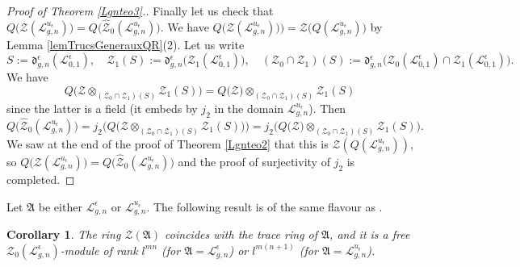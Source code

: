 \documentclass[11pt]{amsart}
\newtheorem{cor}[teo]{Corollary}
\newcommand{\e}{\epsilon}
\newcommand{\Ll}{\mathcal{L}}
\begin{document}
\begin{proof}[Proof of Theorem \ref{Lgnteo3}.]
Finally let us check that $Q\bigl(\mathcal{Z}(\Ll_{g,n}^{u_\e})\bigr) = Q\bigl( \hat{\mathcal{Z}}_0(\Ll_{g,n}^{u_\e}) \bigr)$. We have $Q\bigl(\mathcal{Z}(\Ll_{g,n}^{u_\e})\bigr)) =  \mathcal{Z}\bigl(Q(\Ll_{g,n}^{u_\e})\bigr)$ by Lemma \ref{lemTrucsGenerauxQR}(2). Let us write
\[ S := \mathfrak{d}_{g,n}^{\e}(\mathcal{L}_{0,1}^\e), \quad \mathcal{Z}_1(S) := \mathfrak{d}_{g,n}^{\e}\bigl(\mathcal{Z}_1(\mathcal{L}_{0,1}^\e)\bigr), \quad (\mathcal{Z}_0\cap \mathcal{Z}_1)(S) := \mathfrak{d}_{g,n}^{\e}\bigl(\mathcal{Z}_0(\mathcal{L}_{0,1}^\e) \cap \mathcal{Z}_1(\mathcal{L}_{0,1}^\e)\bigr). \]
We have 
\[ Q\bigl( \mathcal{Z} \otimes_{(\mathcal{Z}_0\cap \mathcal{Z}_1)(S)} \mathcal{Z}_1(S)\bigr) =  Q\bigl( \mathcal{Z} \bigr) \otimes_{(\mathcal{Z}_0\cap \mathcal{Z}_1)(S)} \mathcal{Z}_1(S) \]
since the latter is a field (it embeds by $j_2$ in the domain $\Ll_{g,n}^{u_\e}$). Then
\[ Q\bigl( \hat{\mathcal{Z}}_0(\Ll_{g,n}^{u_\e}) \bigr) = j_2\bigl( Q\bigl( \mathcal{Z} \otimes_{(\mathcal{Z}_0\cap \mathcal{Z}_1)(S)} \mathcal{Z}_1(S)\bigr)\bigr) = j_2\bigl( Q\bigl( \mathcal{Z} \bigr) \otimes_{(\mathcal{Z}_0\cap \mathcal{Z}_1)(S)} \mathcal{Z}_1(S)\bigr). \]
We saw at the end of the proof of Theorem \ref{Lgnteo2} that this is $\mathcal{Z}(Q(\Ll_{g,n}^{u_\e}))$, so $Q\bigl(\mathcal{Z}(\Ll_{g,n}^{u_\e})\bigr) = Q\bigl( \hat{\mathcal{Z}}_0(\Ll_{g,n}^{u_\e}) \bigr)$ and the proof of surjectivity of $j_2$ is completed.
\end{proof}

Let $\mathfrak{A}$ be either $\Ll_{g,n}^{\e}$ or $\Ll_{g,n}^{u_\e}$. The following result is of the same flavour as \cite[Prop.\,20.2(ii)]{DCP}.

\begin{cor}\label{corZZ0} The ring $\mathcal{Z}(\mathfrak{A})$ coincides with the trace ring of $\mathfrak{A}$, and it is a free $\mathcal{Z}_0(\mathcal{L}_{g,n}^{\e})$-module of rank $l^{mn}$ (for $\mathfrak{A}=\Ll_{g,n}^{\e}$) or $l^{m(n+1)}$ (for $\mathfrak{A}=\Ll_{g,n}^{u_\e}$). 
\end{cor}
\end{document}
